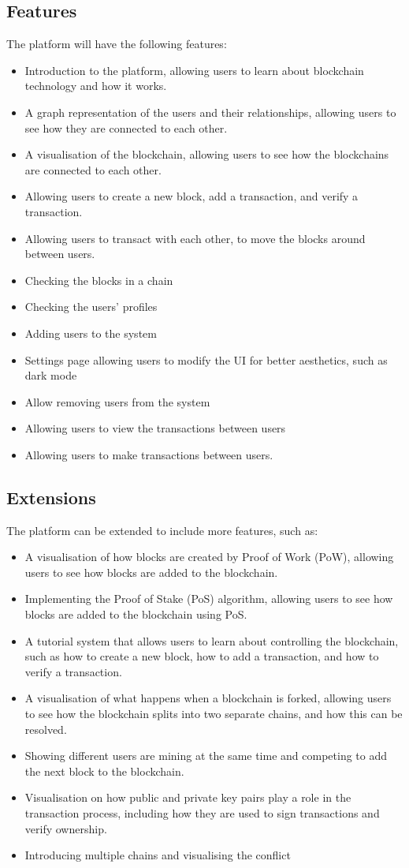 \documentclass[12pt, a4paper]{scrartcl}
\begin{document}
\subsection{Features}
The platform will have the following features:
\begin{itemize}
    \item Introduction to the platform, allowing users to learn about blockchain technology and how it works.
    \item A graph representation of the users and their relationships, allowing users to see how they are connected to each other.
    \item A visualisation of the blockchain, allowing users to see how the blockchains are connected to each other.
    \item Allowing users to create a new block, add a transaction, and verify a transaction.
    \item Allowing users to transact with each other, to move the blocks around between users.
    \item Checking the blocks in a chain
    \item Checking the users' profiles
    \item Adding users to the system
    \item Settings page allowing users to modify the UI for better aesthetics, such as dark mode
    \item Allow removing users from the system
    \item Allowing users to view the transactions between users
    \item Allowing users to make transactions between users.
\end{itemize}
\newpage
\subsection{Extensions}
The platform can be extended to include more features, such as:
\begin{itemize}
    \item A visualisation of how blocks are created by Proof of Work (PoW), allowing users to see how blocks are added to the blockchain.
    \item Implementing the Proof of Stake (PoS) algorithm, allowing users to see how blocks are added to the blockchain using PoS.
    \item A tutorial system that allows users to learn about controlling the blockchain, such as how to create a new block, how to add a transaction, and how to verify a transaction.
    \item A visualisation of what happens when a blockchain is forked, allowing users to see how the blockchain splits into two separate chains, and how this can be resolved.
    \item Showing different users are mining at the same time and competing to add the next block to the blockchain.
    \item Visualisation on how public and private key pairs play a role in the transaction process, including how they are used to sign transactions and verify ownership.
    \item Introducing multiple chains and visualising the conflict
\end{itemize}
\newpage
\end{document}
